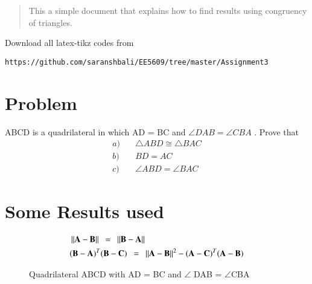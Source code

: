 \documentclass[journal,12pt,twocolumn]{IEEEtran}
\begin{document}
%
\begin{abstract}
This a simple document that explains how to find results using congruency of triangles.
\end{abstract}
%
%
Download all latex-tikz codes from 
%
\begin{lstlisting}
https://github.com/saranshbali/EE5609/tree/master/Assignment3
\end{lstlisting}
%
\section{Problem}
ABCD is a quadrilateral in which AD = BC and $\angle{DAB}  = \angle{CBA}$ . Prove that
\begin{align}
a) & \quad	\triangle ABD \cong \triangle BAC \\
b) & \quad BD = AC \\ 
c) & \quad \angle ABD = \angle BAC
\end{align}
\section{Some Results used}
\begin{align}
 & \left\lVert\mathbf{A}-\mathbf{B}\right\rVert \enspace = \enspace   \left\lVert\mathbf{B}-\mathbf{A}\right\rVert \\
 & (\mathbf{B}-\mathbf{A})^T(\mathbf{B}-\mathbf{C}) \enspace = \enspace \left\lVert\mathbf{A}-\mathbf{B}\right\rVert^2 - (\mathbf{A}-\mathbf{C})^T(\mathbf{A}-\mathbf{B}) 
\end{align}
\begin{figure}[!htb]
	\centering
	\caption{Quadrilateral ABCD with AD = BC and $\angle$ DAB = $\angle$CBA}
\end{figure}
\end{document}
